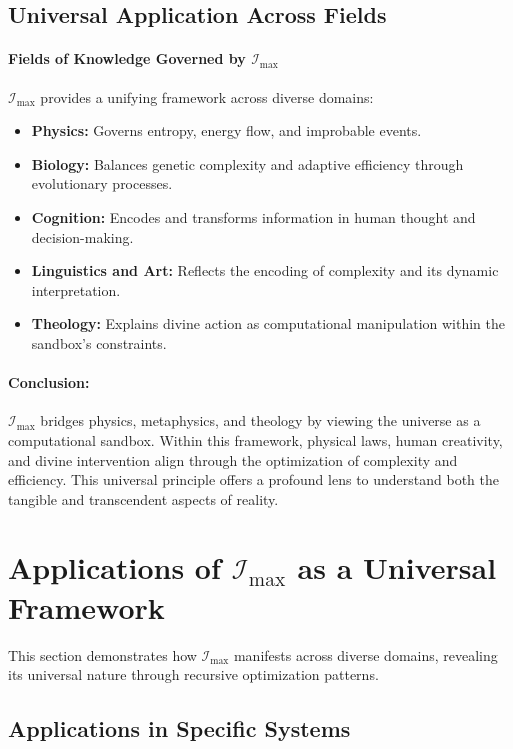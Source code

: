 \documentclass[12pt]{article}
\begin{document}
\subsection{Universal Application Across Fields}

\paragraph{Fields of Knowledge Governed by \(\mathcal{I}_{\text{max}}\)}
\(\mathcal{I}_{\text{max}}\) provides a unifying framework across diverse domains:
\begin{itemize}
    \item \textbf{Physics:} Governs entropy, energy flow, and improbable events.
    \item \textbf{Biology:} Balances genetic complexity and adaptive efficiency through evolutionary processes.
    \item \textbf{Cognition:} Encodes and transforms information in human thought and decision-making.
    \item \textbf{Linguistics and Art:} Reflects the encoding of complexity and its dynamic interpretation.
    \item \textbf{Theology:} Explains divine action as computational manipulation within the sandbox's constraints.
\end{itemize}

\paragraph{Conclusion:}
\(\mathcal{I}_{\text{max}}\) bridges physics, metaphysics, and theology by viewing the universe as a computational sandbox. Within this framework, physical laws, human creativity, and divine intervention align through the optimization of complexity and efficiency. This universal principle offers a profound lens to understand both the tangible and transcendent aspects of reality.


\section{Applications of $\mathcal{I}_{\text{max}}$ as a Universal Framework}

This section demonstrates how $\mathcal{I}_{\text{max}}$ manifests across diverse domains, revealing its universal nature through recursive optimization patterns.

\subsection{Applications in Specific Systems}
\end{document}
